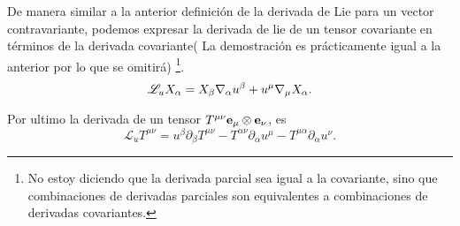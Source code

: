 \noindent De manera similar a la anterior definición de la derivada de Lie para un vector contravariante, podemos expresar la derivada de lie de un tensor covariante en términos de la derivada covariante( La demostración es prácticamente igual a la anterior por lo que se omitirá) \footnote{No estoy diciendo que la derivada parcial sea igual a la covariante, sino que combinaciones de derivadas parciales son equivalentes a combinaciones de derivadas covariantes.}.
\begin{equation}
    \mathscr{L}_u X_\alpha=X_\beta \mathbf{\nabla}_\alpha u^\beta+u^\mu \mathbf{\nabla}_\mu X_\alpha.
\end{equation}


\noindent Por ultimo la derivada de un tensor $T^{\mu \nu} \mathbf{e_\mu} \otimes \mathbf{e_\nu}$, es
\begin{equation}
    \mathscr{L}_u T^{\mu \nu} = u^\beta \partial_\beta T^{\mu \nu}   -  T^{\alpha \nu} \partial_\alpha u^\mu  -T^{\mu \alpha} \partial_\alpha u^\nu.
\end{equation}

